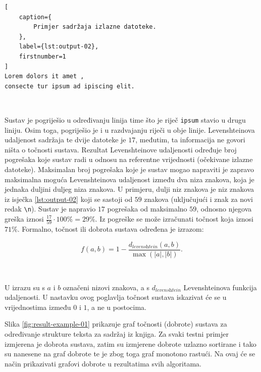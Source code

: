 \documentclass[times, utf8, zavrsni]{fer}
\begin{document}
\pagebreak

\begin{lstlisting}[
    caption={
        Primjer sadržaja izlazne datoteke.
    },
    label={lst:output-02},
    firstnumber=1
]
Lorem dolors it amet ,
consecte tur ipsum ad ipiscing elit.
\end{lstlisting}

\

Sustav je pogriješio u određivanju linija time što je riječ \lstinline{ipsum}
stavio u drugu liniju. Osim toga, pogriješio je i u razdvajanju riječi u obje
linije. Levenshteinova udaljenost sadržaja te dvije datoteke je $17$, međutim,
ta informacija ne govori ništa o točnosti sustava. Rezultat Levenshteinove
udaljenosti određuje broj pogrešaka koje sustav radi u odnosu na referentne
vrijednosti (očekivane izlazne datoteke). Maksimalan broj pogrešaka koje je
sustav mogao napraviti je zapravo maksimalna moguća Levenshteinova udaljenost
između dva niza znakova, koja je jednaka duljini duljeg niza znakova. U
primjeru, dulji niz znakova je niz znakova iz isječka
\ref{lst:output-02} koji se sastoji od $59$ znakova (uključujući i znak za novi
redak \lstinline{\n}). Sustav je napravio $17$ pogrešaka od maksimalno $59$,
odnosno njegova greška iznosi $\frac{17}{59} \cdot 100\% = 29\%$. Iz pogreške
se može izračunati točnost koja iznosi $71\%$.
Formalno, točnost ili dobrota  sustava određena je izrazom:

\begin{equation}
\label{eq:fitness}
f(a, b) = 1 - \frac{d_\textit{levenshtein}(a, b)}{\max(|a|, |b|)} \texttt{.}
\end{equation}

\

U izrazu su s $a$ i $b$ označeni nizovi znakova, a s
$d_\textit{levenshtein}$ Levenshteinova funkcija udaljenosti. U nastavku ovog
poglavlja točnost sustava iskazivat će se u vrijednostima
između $0$ i $1$, a ne u postocima.

Slika \ref{fig:result-example-01} prikazuje graf točnosti (dobrote) sustava za
određivanje strukture teksta za sadržaj iz knjiga. Za svaki testni
primjer izmjerena je dobrota sustava, zatim su izmjerene dobrote uzlazno
sortirane i tako su nanesene na graf dobrote te je zbog toga graf monotono
rastući. Na ovaj će se način prikazivati grafovi dobrote u rezultatima svih
algoritama.
\end{document}
